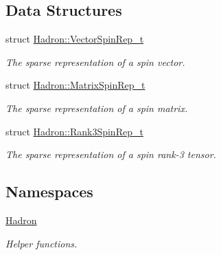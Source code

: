 \subsection*{Data Structures}
\begin{DoxyCompactItemize}
\item 
struct \mbox{\hyperlink{structHadron_1_1VectorSpinRep__t}{Hadron\+::\+Vector\+Spin\+Rep\+\_\+t}}
\begin{DoxyCompactList}\small\item\em The sparse representation of a spin vector. \end{DoxyCompactList}\item 
struct \mbox{\hyperlink{structHadron_1_1MatrixSpinRep__t}{Hadron\+::\+Matrix\+Spin\+Rep\+\_\+t}}
\begin{DoxyCompactList}\small\item\em The sparse representation of a spin matrix. \end{DoxyCompactList}\item 
struct \mbox{\hyperlink{structHadron_1_1Rank3SpinRep__t}{Hadron\+::\+Rank3\+Spin\+Rep\+\_\+t}}
\begin{DoxyCompactList}\small\item\em The sparse representation of a spin rank-\/3 tensor. \end{DoxyCompactList}\end{DoxyCompactItemize}
\subsection*{Namespaces}
\begin{DoxyCompactItemize}
\item 
 \mbox{\hyperlink{namespaceHadron}{Hadron}}
\begin{DoxyCompactList}\small\item\em Helper functions. \end{DoxyCompactList}\end{DoxyCompactItemize}
